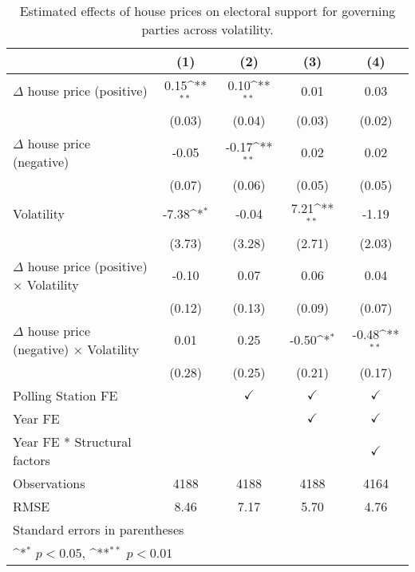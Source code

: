 \begin{table}[htbp]\centering
\def\sym#1{\ifmmode^{#1}\else\(^{#1}\)\fi}
\caption{Estimated effects of house prices on electoral support for governing parties across volatility.}
\begin{tabular}{l*{4}{c}}
\hline\hline
                    &\multicolumn{1}{c}{(1)}        &\multicolumn{1}{c}{(2)}        &\multicolumn{1}{c}{(3)}        &\multicolumn{1}{c}{(4)}        \\
\hline
$\Delta$ house price (positive)&        0.15\sym{**}&        0.10\sym{**}&        0.01        &        0.03        \\
                    &      (0.03)        &      (0.04)        &      (0.03)        &      (0.02)        \\
[1em]
$\Delta$ house price (negative)&       -0.05        &       -0.17\sym{**}&        0.02        &        0.02        \\
                    &      (0.07)        &      (0.06)        &      (0.05)        &      (0.05)        \\
[1em]
Volatility          &       -7.38\sym{*} &       -0.04        &        7.21\sym{**}&       -1.19        \\
                    &      (3.73)        &      (3.28)        &      (2.71)        &      (2.03)        \\
[1em]
$\Delta$ house price (positive) $\times$ Volatility&       -0.10        &        0.07        &        0.06        &        0.04        \\
                    &      (0.12)        &      (0.13)        &      (0.09)        &      (0.07)        \\
[1em]
$\Delta$ house price (negative) $\times$ Volatility&        0.01        &        0.25        &       -0.50\sym{*} &       -0.48\sym{**}\\
                    &      (0.28)        &      (0.25)        &      (0.21)        &      (0.17)        \\
[1em]
\hline Polling Station FE&                    &$\checkmark$        &$\checkmark$        &$\checkmark$        \\
[1em]
Year FE             &                    &                    &$\checkmark$        &$\checkmark$        \\
[1em]
Year FE * Structural factors&                    &                    &                    &$\checkmark$        \\
\hline
Observations        &        4188        &        4188        &        4188        &        4164        \\
RMSE                &        8.46        &        7.17        &        5.70        &        4.76        \\
\hline\hline
\multicolumn{5}{l}{\footnotesize Standard errors in parentheses}\\
\multicolumn{5}{l}{\footnotesize \sym{*} \(p<0.05\), \sym{**} \(p<0.01\)}\\
\end{tabular}
\end{table}
